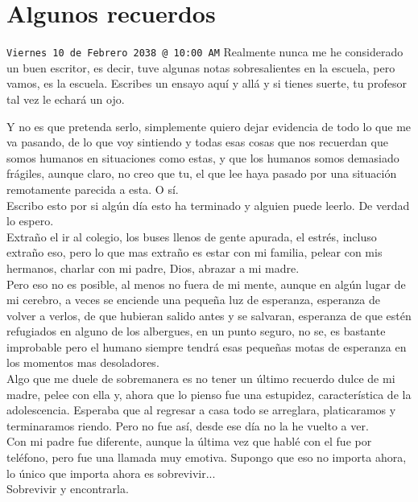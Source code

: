 \chapter{Algunos recuerdos}
\texttt{Viernes 10 de Febrero 2038 @ 10:00 AM}
\vspace*{1.5cm}
Realmente nunca me he considerado un buen escritor, es decir, tuve algunas notas sobresalientes en la escuela, 
pero vamos, es la escuela. Escribes un ensayo aquí y allá y si tienes suerte, tu profesor tal vez le echará un ojo.

Y no es que pretenda serlo, simplemente quiero dejar evidencia de todo lo que me va pasando, de lo que voy 
sintiendo y todas esas cosas que nos recuerdan que somos humanos en situaciones como estas, y que los humanos somos demasiado frágiles, aunque claro, 
no creo que tu, el que lee haya pasado por una situación remotamente parecida a esta. O sí.\\
Escribo esto por si algún día esto ha terminado y alguien puede leerlo. De verdad lo espero.\\
Extraño el ir al colegio, los buses llenos de gente apurada, el estrés, incluso extraño eso, pero lo que mas extraño es estar con mi familia, pelear con mis hermanos, charlar con mi padre, Dios, abrazar a mi madre.\\
Pero eso no es posible, al menos no fuera de mi mente, aunque en algún lugar de mi cerebro, a veces se 
enciende una pequeña luz de esperanza, esperanza de volver a verlos, de que hubieran salido antes y  se salvaran, esperanza de que estén refugiados en alguno de los albergues, en un punto seguro, no se, es bastante improbable pero el humano siempre tendrá esas pequeñas motas de esperanza en los momentos mas desoladores.\\
Algo que me duele de sobremanera es no tener un último recuerdo dulce de mi madre, pelee con ella y, ahora que lo pienso fue una estupidez, característica de la adolescencia. Esperaba que al regresar a casa todo se arreglara, platicaramos y terminaramos riendo. Pero no fue así, desde ese día no la he vuelto a ver.\\

Con mi padre fue diferente, aunque la última vez que hablé con el fue por teléfono, pero fue una llamada muy 
emotiva. Supongo que eso no importa ahora, lo único que importa ahora es sobrevivir...\\
Sobrevivir y encontrarla.
